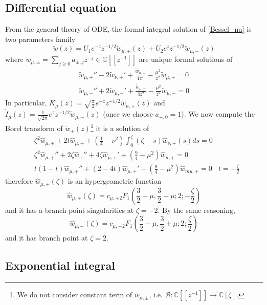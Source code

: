 \documentclass{article}
\newcommand{\C}{\mathbb{C}}
\begin{document}
\subsection{Differential equation}
From the general theory of ODE, the formal integral solution of \eqref{Bessel_nu} is two parameters family 
\begin{equation}
\tilde{w}(z)=U_1e^{-z}z^{-1/2}\tilde{w}_{\mu,+}(z)+U_2e^{z}z^{-1/2}\tilde{w}_{\mu,-}(z)
\end{equation} 
where $\tilde{w}_{\mu,\pm}=\sum_{j\geq 0}a_{\pm,j}z^{-j}\in\C[\![z^{-1}]\!]$ are unique formal solutions of
\begin{align*}
\tilde{w}_{\mu,+}''-2\tilde{w}_{\nu,+}'+\frac{\tilde{w}_{\mu,+}}{4z^2}-\frac{\mu^2}{z^2}\tilde{w}_{\mu,+}=0\\
\tilde{w}_{\mu,-}''+2\tilde{w}_{\mu,-}'+\frac{\tilde{w}_{\mu,-}}{4z^2}-\frac{\mu^2}{z^2}\tilde{w}_{\mu,-}=0
\end{align*} 
In particular, $\tilde{K}_{\mu}(z)=\sqrt{\frac{\pi}{2}}e^{-z}z^{-1/2}\tilde{w}_{\mu,+}(z)$ and $\tilde{I}_\mu(z)=\frac{1}{\sqrt{2\pi}}e^zz^{-1/2}\tilde{w}_{\mu,-}(z)$ (once we choose $a_{\pm,0}=1$). We now compute the Borel transform of $\tilde{w}_+(z)$\footnote{We do not consider constant term of $\tilde{w}_{\mu,\pm}$, i.e. $\mathcal{B}:\C[\![z^{-1}]\!]\to \C[\zeta]$.} it is a solution of 
\begin{align*}
&\zeta^2\hat{w}_{\mu,+}+2t\hat{w}_{\mu,+}+\left(\frac{1}{4}-\nu^2\right)\int_0^{\zeta}(\zeta-s)\hat{w}_{\nu,+}(s)ds=0 &\\
&\zeta^2\hat{w}_{\mu,+}''+2\zeta\hat{w}_+''+4\zeta\hat{w}_{\mu,+}'+\left(\frac{9}{4}-\mu^2\right)\hat{w}_{\mu,+}=0 & \\
&t(1-t)\hat{w}_{\mu,+}''+(2-4t)\hat{w}_{\mu,+}'-\left(\frac{9}{4}-\mu^2\right)\hat{w}_{mu,+}=0 & t=-\frac{\zeta}{2}
\end{align*} 
therefore $\hat{w}_{\mu,+}(\zeta)$ is an hypergeometric function
\begin{equation}
\hat{w}_{\mu,+}(\zeta)=c_{\mu,+} {}_2F_1\left(\frac{3}{2}-\mu,\frac{3}{2}+\mu;2;-\frac{\zeta}{2}\right)
\end{equation}
and it has a branch point singularities at $\zeta=-2$. By the same reasoning, 
\begin{equation}
\hat{w}_{\mu,-}(\zeta)=c_{\mu,-} {}_2F_1\left(\frac{3}{2}-\mu,\frac{3}{2}+\mu;2;\frac{\zeta}{2}\right)
\end{equation} 
and it has branch point at $\zeta=2$. 


\subsection{Exponential integral}
\end{document}
